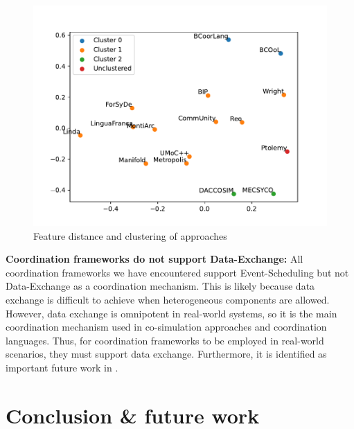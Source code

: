 \documentclass[runningheads]{llncs}
\begin{document}
\begin{figure}[ht]
	\centering
	\includegraphics[width=1\textwidth]{images/approach_scatter}
	\caption{Feature distance and clustering of approaches}
	\label{fig:clusters}
\end{figure}








\textbf{Coordination frameworks do not support Data-Exchange:} All coordination frameworks we have encountered support \textsf{Event-Scheduling} but not \textsf{Data-Exchange} as a coordination mechanism.
This is likely because data exchange is difficult to achieve when heterogeneous components are allowed.
However, data exchange is omnipotent in real-world systems, so it is the main coordination mechanism used in co-simulation approaches and coordination languages.
Thus, for coordination frameworks to be employed in real-world scenarios, they must support data exchange.
Furthermore, it is identified as important future work in \cite{krauterBehavioralConsistencyMultimodeling2023,varalarsenBCOolBehavioralCoordination2016}.

\section{Conclusion \& future work} \label{sec:conclusion}



\end{document}
